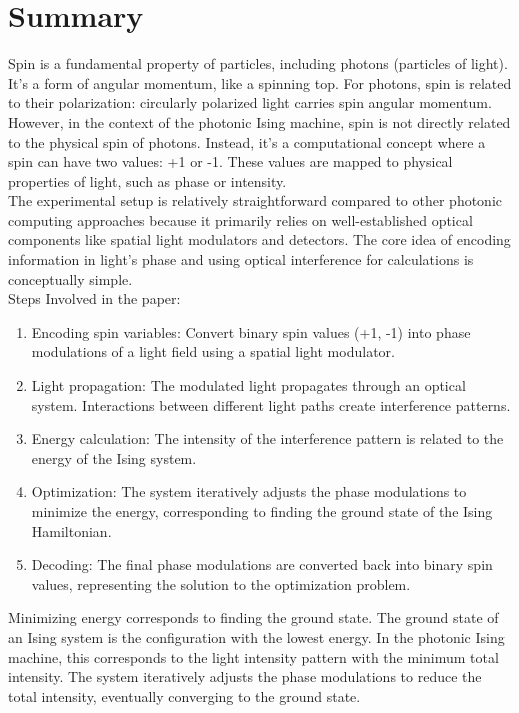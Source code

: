 \section{Summary}

Spin is a fundamental property of particles, including photons (particles of light). It's a form of angular momentum, like a spinning top. For photons, spin is related to their polarization: circularly polarized light carries spin angular momentum. However, in the context of the photonic Ising machine, spin is not directly related to the physical spin of photons. Instead, it's a computational concept where a spin can have two values: +1 or -1. These values are mapped to physical properties of light, such as phase or intensity. \\

The experimental setup is relatively straightforward compared to other photonic computing approaches because it primarily relies on well-established optical components like spatial light modulators and detectors. The core idea of encoding information in light's phase and using optical interference for calculations is conceptually simple. \\

Steps Involved in the paper: 
\begin{enumerate}
    \item Encoding spin variables: Convert binary spin values (+1, -1) into phase modulations of a light field using a spatial light modulator.
    \item Light propagation: The modulated light propagates through an optical system. Interactions between different light paths create interference patterns.
    \item Energy calculation: The intensity of the interference pattern is related to the energy of the Ising system.
    \item Optimization: The system iteratively adjusts the phase modulations to minimize the energy, corresponding to finding the ground state of the Ising Hamiltonian.
    \item Decoding: The final phase modulations are converted back into binary spin values, representing the solution to the optimization problem.
\end{enumerate}

 Minimizing energy corresponds to finding the ground state. The ground state of an Ising system is the configuration with the lowest energy. In the photonic Ising machine, this corresponds to the light intensity pattern with the minimum total intensity. The system iteratively adjusts the phase modulations to reduce the total intensity, eventually converging to the ground state. \\

